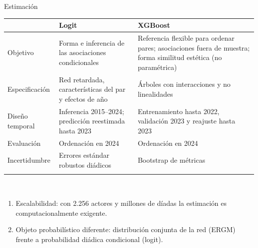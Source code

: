 \documentclass[
  8pt,
  ignorenonframetext,
  aspectratio=169,
  spanish,
]{beamer}
\newcommand{\lightrowrule}{\arrayrulecolor{black!25}\specialrule{0.4pt}{1pt}{1pt}\arrayrulecolor{black}}
\begin{document}
\begin{frame}{Estimación}
\label{estimaciuxf3n}
~

\begin{longtable}[]{@{}
  >{\raggedright\arraybackslash}p{}
  >{\raggedright\arraybackslash}p{}
  >{\raggedright\arraybackslash}p{}@{}}
\toprule\noalign{}
\begin{minipage}[b]{\linewidth}\raggedright
\end{minipage} & \begin{minipage}[b]{\linewidth}\raggedright
\textbf{Logit}
\end{minipage} & \begin{minipage}[b]{\linewidth}\raggedright
\textbf{XGBoost}
\end{minipage} \\
\midrule\noalign{}
\endhead
\bottomrule\noalign{}
\endlastfoot
Objetivo & Forma e inferencia de las asociaciones condicionales &
Referencia flexible para ordenar pares; asociaciones fuera de muestra;
forma similitud estética (no paramétrica) \\ \lightrowrule
Especificación & Red retardada, características del par y efectos de año
& Árboles con interacciones y no linealidades \\ \lightrowrule
Diseño temporal & Inferencia 2015--2024; predicción reestimada hasta
2023 & Entrenamiento hasta 2022, validación 2023 y reajuste hasta
2023 \\ \lightrowrule
Evaluación & Ordenación en 2024 & Ordenación en 2024 \\ \lightrowrule
Incertidumbre & Errores estándar robustos diádicos & Bootstrap de
métricas \\ \lightrowrule
\end{longtable}

~

\begin{tcolorbox}[enhanced jigsaw, arc=.35mm, bottomtitle=1mm, colbacktitle=quarto-callout-note-color!10!white, breakable, toprule=.15mm, coltitle=black, colback=white, rightrule=.15mm, colframe=quarto-callout-note-color-frame, leftrule=.75mm, toptitle=1mm, opacitybacktitle=0.6, opacityback=0, title={¿Por qué no un ERGM?}, titlerule=0mm, bottomrule=.15mm, left=2mm]

\begin{enumerate}
\item
  Escalabilidad: con 2.256 actores y millones de díadas la estimación es
  computacionalmente exigente.
\item
  Objeto probabilístico diferente: distribución conjunta de la red
  (ERGM) frente a probabilidad diádica condicional (logit).
\end{enumerate}


\end{tcolorbox}
\end{frame}
\end{document}
